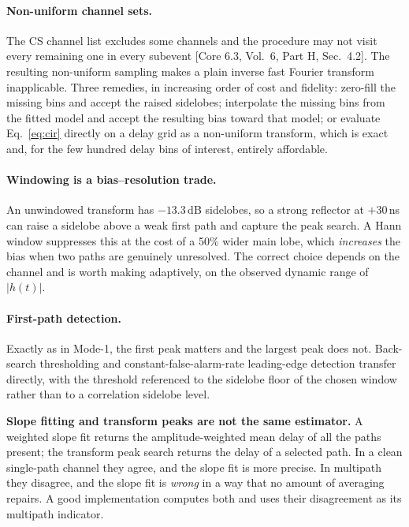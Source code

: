 \documentclass[11pt,a4paper]{article}
\newcommand{\core}[1]{\textcolor{rulegrey}{\small[Core 6.3, #1]}}
\begin{document}
\paragraph{Non-uniform channel sets.} The CS channel list excludes some channels and the procedure may
not visit every remaining one in every subevent \core{Vol.\ 6, Part H, Sec.\ 4.2}. The resulting
non-uniform sampling makes a plain inverse fast Fourier transform inapplicable. Three remedies, in
increasing order of cost and fidelity: zero-fill the missing bins and accept the raised sidelobes;
interpolate the missing bins from the fitted model and accept the resulting bias toward that model;
or evaluate Eq.~\eqref{eq:cir} directly on a delay grid as a non-uniform transform, which is exact
and, for the few hundred delay bins of interest, entirely affordable.

\paragraph{Windowing is a bias--resolution trade.} An unwindowed transform has $-13.3$\,dB sidelobes,
so a strong reflector at $+30$\,ns can raise a sidelobe above a weak first path and capture the peak
search. A Hann window suppresses this at the cost of a 50\% wider main lobe, which \emph{increases}
the bias when two paths are genuinely unresolved. The correct choice depends on the channel and is
worth making adaptively, on the observed dynamic range of $|h(t)|$.

\paragraph{First-path detection.} Exactly as in Mode-1, the first peak matters and the largest peak
does not. Back-search thresholding and constant-false-alarm-rate leading-edge detection transfer
directly, with the threshold referenced to the sidelobe floor of the chosen window rather than to a
correlation sidelobe level.

\begin{callout}
\textbf{Slope fitting and transform peaks are not the same estimator.} A weighted slope fit returns
the amplitude-weighted mean delay of all the paths present; the transform peak search returns the
delay of a selected path. In a clean single-path channel they agree, and the slope fit is more
precise. In multipath they disagree, and the slope fit is \emph{wrong} in a way that no amount of
averaging repairs. A good implementation computes both and uses their disagreement as its multipath
indicator.
\end{callout}
\end{document}
